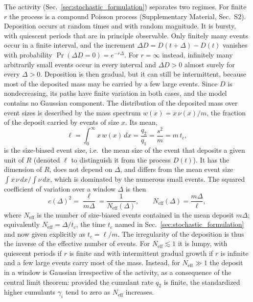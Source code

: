 \documentclass[preprint,12pt]{elsarticle}
\begin{document}
The activity (Sec.~\ref{sec:stochastic_formulation})
separates two regimes. For finite $r$ the process is a compound
Poisson process (Supplementary Material,
Sec.~S2).
Deposition occurs at random times and with random magnitude.
It is bursty, with quiescent
periods that are in principle observable.
Only finitely many events occur in
a finite interval, and the increment $\Delta D=D(t+\Delta)-D(t)$ vanishes with
probability $\Pr(\Delta D=0)=e^{-r\Delta}$.
For $r=\infty$ instead, infinitely many
arbitrarily small events occur in every interval and
$\Delta D>0$ almost surely
for every $\Delta>0$. Deposition is then gradual, but it can still be intermittent,
because most of the deposited mass may be carried by a few large events. Since
$D$ is nondecreasing, its paths have finite variation in both cases, and the
model contains no Gaussian component.
The distribution of the deposited mass over event sizes is described by the
mass spectrum $w(x)=x\,\nu(x)/m$, the fraction of the deposit carried by events
of size $x$. Its mean,
\begin{equation}
  \ell=\int_0^\infty x\,w(x)\,dx=\frac{q_2}{q_1}=\frac{s^2}{m}=m\,t_c ,
  \label{eq:ell}
\end{equation}
is the size-biased event size, i.e.\ the mean size of the event that deposits a
given unit of $R$ (denoted $\ell$ to distinguish it from the process $D(t)$).
It has the dimension of $R$, does not depend on $\Delta$, and differs from the
mean event size $\int x\,\nu\,dx\big/\!\int\nu\,dx$, which is dominated by the
numerous small events. The squared coefficient of variation over a window $\Delta$
is then
\begin{equation}
  c(\Delta)^2=\frac{\ell}{m\Delta}=\frac{1}{N_{\mathrm{eff}}(\Delta)},\qquad
  N_{\mathrm{eff}}(\Delta)=\frac{m\Delta}{\ell},
  \label{eq:neff}
\end{equation}
where $N_{\mathrm{eff}}$ is the number of size-biased events contained in the
mean deposit $m\Delta$; equivalently $N_{\mathrm{eff}}=\Delta/t_c$, the time
$t_c$ named in Sec.~\ref{sec:stochastic_formulation} and now given
explicitly as $t_c=\ell/m$. The irregularity of the deposition is thus the inverse
of the effective number of events.
For $N_{\mathrm{eff}}\lesssim1$ it is lumpy, with quiescent periods if
$r$ is finite and with intermittent gradual growth if $r$ is infinite and a few large
events carry most of the mass.
Instead, for
$N_{\mathrm{eff}}\gg1$ the deposit in a window is Gaussian irrespective of the
activity, as a consequence of the central limit theorem: provided the
cumulant rate $q_2$ is finite, 
the standardized higher cumulants $\gamma_i$
tend to zero as $N_{\mathrm{eff}}$ increases.
\end{document}
